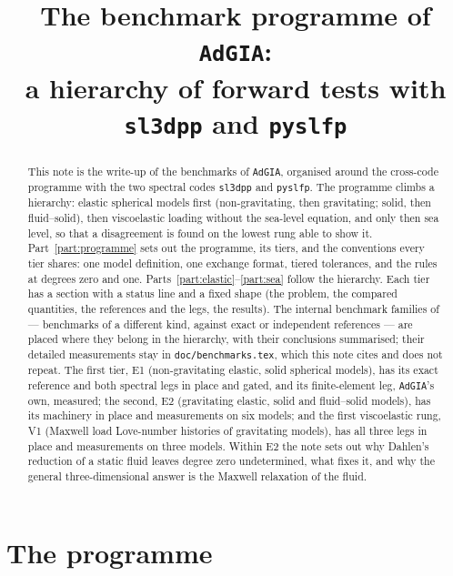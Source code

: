\documentclass[11pt]{article}
\title{The benchmark programme of \texttt{AdGIA}:\\
       a hierarchy of forward tests with \texttt{sl3dpp} and \texttt{pyslfp}}
\author{}
\date{}
\numberwithin{equation}{section}
\newcommand{\code}[1]{\texttt{#1}}
\begin{document}
\maketitle

\begin{abstract}
\noindent
This note is the write-up of the benchmarks of \code{AdGIA}, organised
around the cross-code programme with the two
spectral codes \code{sl3dpp} and \code{pyslfp}. The programme climbs a
hierarchy: elastic spherical models first (non-gravitating, then
gravitating; solid, then fluid--solid), then viscoelastic loading without
the sea-level equation, and only then sea level, so that a disagreement is
found on the lowest rung able to show it. Part~\ref{part:programme} sets out
the programme, its tiers, and the conventions every tier
shares: one model definition, one exchange format, tiered tolerances, and
the rules at degrees zero and one. Parts~\ref{part:elastic}--\ref{part:sea}
follow the hierarchy. Each tier has a section with a status line and
a fixed shape (the problem, the compared quantities, the references and the
legs, the results). The internal benchmark families
of  --- benchmarks of a different kind, against exact or
independent references --- are placed where they belong in the hierarchy,
with their conclusions summarised; their detailed measurements stay in
\code{doc/benchmarks.tex}, which this note cites and does not repeat. The
first tier, E1 (non-gravitating elastic, solid
spherical models), has its exact reference and both spectral legs in place
and gated, and its finite-element leg, \code{AdGIA}'s own, measured;
the second, E2 (gravitating elastic, solid and fluid--solid
models), has its machinery in place and measurements on six models;
and the first viscoelastic rung, V1 (Maxwell load Love-number histories of
gravitating models), has all three legs in place and measurements on
three models. Within E2 the note sets out why Dahlen's reduction of a static fluid leaves
degree zero undetermined, what fixes it, and why the general
three-dimensional answer is the Maxwell relaxation of the fluid.
\end{abstract}

\tableofcontents

\part{The programme}
\label{part:programme}
\end{document}
